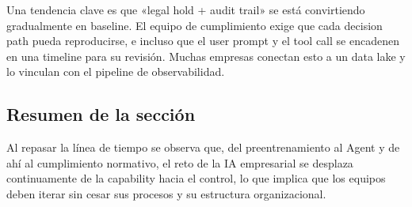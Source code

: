 Una tendencia clave es que «legal hold + audit trail» se está convirtiendo gradualmente en baseline. El equipo de cumplimiento exige que cada decision path pueda reproducirse, e incluso que el user prompt y el tool call se encadenen en una timeline para su revisión. Muchas empresas conectan esto a un data lake y lo vinculan con el pipeline de observabilidad.

\subsection{Resumen de la sección}

Al repasar la línea de tiempo se observa que, del preentrenamiento al Agent y de ahí al cumplimiento normativo, el reto de la IA empresarial se desplaza continuamente de la capability hacia el control, lo que implica que los equipos deben iterar sin cesar sus procesos y su estructura organizacional.

